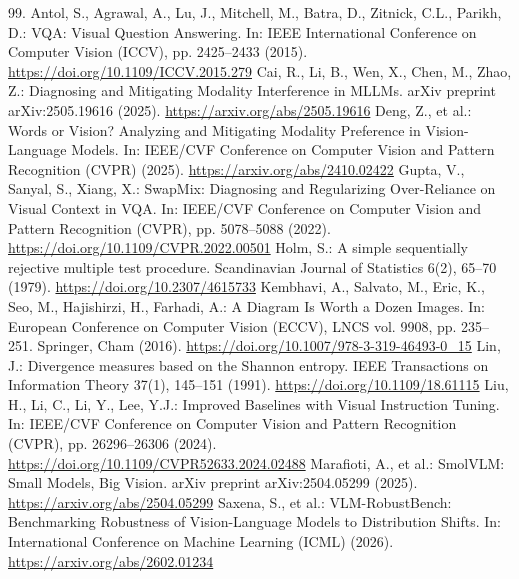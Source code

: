\documentclass[graybox]{svmult}
\begin{document}
\begin{thebibliography}{99.}
\setlength{\itemsep}{0pt plus 0.2pt}
\setlength{\parsep}{0pt}
\setlength{\parskip}{0pt}
\footnotesize
{}
Antol, S., Agrawal, A., Lu, J., Mitchell, M., Batra, D., Zitnick, C.L., Parikh, D.: VQA: Visual Question Answering. In: IEEE International Conference on Computer Vision (ICCV), pp. 2425–2433 (2015). \url{https://doi.org/10.1109/ICCV.2015.279}
Cai, R., Li, B., Wen, X., Chen, M., Zhao, Z.: Diagnosing and Mitigating Modality Interference in MLLMs. arXiv preprint arXiv:2505.19616 (2025). \url{https://arxiv.org/abs/2505.19616}
Deng, Z., et al.: Words or Vision? Analyzing and Mitigating Modality Preference in Vision-Language Models. In: IEEE/CVF Conference on Computer Vision and Pattern Recognition (CVPR) (2025). \url{https://arxiv.org/abs/2410.02422}
Gupta, V., Sanyal, S., Xiang, X.: SwapMix: Diagnosing and Regularizing Over-Reliance on Visual Context in VQA. In: IEEE/CVF Conference on Computer Vision and Pattern Recognition (CVPR), pp. 5078–5088 (2022). \url{https://doi.org/10.1109/CVPR.2022.00501}
Holm, S.: A simple sequentially rejective multiple test procedure. Scandinavian Journal of Statistics 6(2), 65–70 (1979). \url{https://doi.org/10.2307/4615733}
Kembhavi, A., Salvato, M., Eric, K., Seo, M., Hajishirzi, H., Farhadi, A.: A Diagram Is Worth a Dozen Images. In: European Conference on Computer Vision (ECCV), LNCS vol. 9908, pp. 235–251. Springer, Cham (2016). \url{https://doi.org/10.1007/978-3-319-46493-0_15}
Lin, J.: Divergence measures based on the Shannon entropy. IEEE Transactions on Information Theory 37(1), 145–151 (1991). \url{https://doi.org/10.1109/18.61115}
Liu, H., Li, C., Li, Y., Lee, Y.J.: Improved Baselines with Visual Instruction Tuning. In: IEEE/CVF Conference on Computer Vision and Pattern Recognition (CVPR), pp. 26296–26306 (2024). \url{https://doi.org/10.1109/CVPR52633.2024.02488}
Marafioti, A., et al.: SmolVLM: Small Models, Big Vision. arXiv preprint arXiv:2504.05299 (2025). \url{https://arxiv.org/abs/2504.05299}
Saxena, S., et al.: VLM-RobustBench: Benchmarking Robustness of Vision-Language Models to Distribution Shifts. In: International Conference on Machine Learning (ICML) (2026). \url{https://arxiv.org/abs/2602.01234}

\end{thebibliography}
\end{document}

